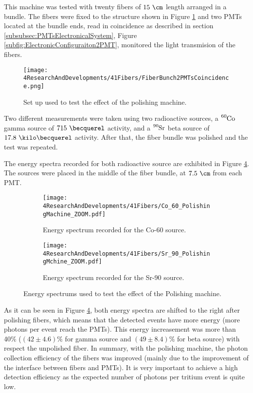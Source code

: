 This machine was tested with twenty fibers of $15~\cm$ length arranged in a bundle. The fibers were fixed to the structure shown in Figure \ref{fig:BunchWith2PMTsCoincidence} and two PMTs located at the bundle ends, read in coincidence as described in section \ref{subsubsec:PMTsElectronicalSystem}, Figure \ref{subfig:ElectronicConfiguraiton2PMT}, monitored the light transmision of the fibers.

\begin{figure}[]
\centering
\texttt{[image: 4ResearchAndDevelopments/41Fibers/FiberBunch2PMTsCoincidence.png]}
\caption{Set up used to test the effect of the polishing machine.\label{fig:BunchWith2PMTsCoincidence}}
\end{figure}

Two different measurements were taken using two radioactive sources, a $\ce{^{60}Co}$ gamma source of $715~\becquerel$ activity, and a $\ce{^{90}Sr}$ beta source of $17.8~\kilo\becquerel$ activity. After that, the fiber bundle was polished and the test was repeated.

The energy spectra recorded for both radioactive source are exhibited in Figure \ref{fig:ResultsOfPolishingMachine}. The sources were placed in the middle of the fiber bundle, at $7.5~\cm$ from each PMT.

\begin{figure}
\centering
    \begin{subfigure}[b]{1\textwidth}
    \centering
    \texttt{[image: 4ResearchAndDevelopments/41Fibers/Co\_60\_PolishingMachine\_ZOOM.pdf]}  
    \caption{Energy spectrum recorded for the Co-60 source.\label{subfig:EnergySpectrumCo60PolishingTest}}
    \end{subfigure}
    \hfill
    \begin{subfigure}[b]{1\textwidth}
    \centering
    \texttt{[image: 4ResearchAndDevelopments/41Fibers/Sr\_90\_PolishingMchine\_ZOOM.pdf]}  
    \caption{Energy spectrum recorded for the Sr-90 source.\label{subfig:EnergySpectrumSr90PolishingTest}}
    \end{subfigure}
 \caption{Energy spectrums used to test the effect of the Polishing machine.}
 \label{fig:ResultsOfPolishingMachine}
\end{figure}

As it can be seen in Figure \ref{fig:ResultsOfPolishingMachine}, both energy spectra are shifted to the right after polishing fibers, which means that the detected events have more energy (more photons per event reach the PMTs). This energy increasement was more than 40\% ($(42 \pm 4.6)\%$ for gamma source and $(49 \pm 8.4)\%$ for beta source) with respect the unpolished fiber. In summary, with the polishing machine, the photon collection efficiency of the fibers was improved  (mainly due to the improvement of the interface between fibers and PMTs). It is very important to achieve a high detection efficiency as the expected number of photons per tritium event is quite low.